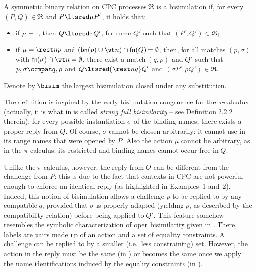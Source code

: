 \documentclass{LMCS}
\begin{document}
\begin{defi}[Bisimulation]
\label{def:bisim}
A symmetric binary relation on CPC processes $\Re$ is a bisimulation if,
for every $(P,Q) \in \Re$ and $P \ltsred\mu P'$, it holds that:
\begin{itemize}
  \item if $\mu = \tau$, then $Q \ltsred\tau Q'$, for some $Q'$ such that $(P',Q') \in \Re$;
  \item if $\mu = \rest n p$ and $({\sf bn}(p)\cup \wt n)\cap {\sf fn}(Q)=\emptyset$,
		then, for all matches $(p,\sigma)$ with 
        ${\sf fn}(\sigma)\cap \wt n = \emptyset$,
        there exist a match $(q,\rho)$ and $Q'$ 
		such that
        $p,\sigma \compat q,\rho$ and
        $Q\ltsred {\rest n q}Q'$ 
        and $(\sigma P',\rho Q')\in \Re$.
\end{itemize}
Denote by $\bisim$ the largest bisimulation closed under any substitution.
\end{defi}

The definition is inspired by the early bisimulation congruence for the
$\pi$-calculus \cite{milner.parrow.ea:calculus-mobile} (actually, it is what
in \cite{sangiorgi.walker:theory-mobile} is called {\em strong full bisimilarity} -- see Definition 2.2.2 therein):
	for every possible instantiation $\sigma$ of the binding names,
	there exists a proper reply from $Q$.
Of course, $\sigma$ cannot be chosen arbitrarily:
	it cannot use in its range names that were opened by $P$.
Also the action $\mu$ cannot be arbitrary, as in the $\pi$-calculus:
	its restricted and binding names cannot occur free in $Q$.

Unlike the $\pi$-calculus, however, the reply from $Q$ can be
different from the challenge from $P$:
	this is due to the fact that contexts in CPC are not powerful enough to
	enforce an identical reply (as highlighted in Examples~1 and~2).
Indeed, this notion of bisimulation allows a challenge $p$ to be replied to by
any compatible $q$, provided that $\sigma$ is properly adapted (yielding $\rho$, as
described by the compatibility relation) before being applied to $Q'$.
This feature somehow resembles the symbolic characterization of 
open bisimilarity given in \cite{San96,BM08}. There, labels are pairs made up
of an action and a set of equality constraints. A challenge can be replied to by a 
smaller (i.e.~less constraining) set. However, the action in the reply must be 
the same (in \cite{San96}) or becomes the same once we apply the name identifications
induced by the equality constraints (in \cite{BM08}).
\end{document}
